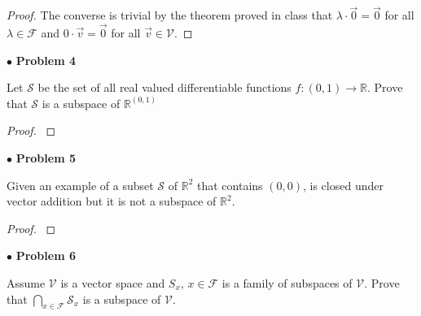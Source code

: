 \documentclass{article}
\begin{document}
\begin{proof}
The converse is trivial by the theorem proved in class that $\lambda \cdot \vec{0} = \vec{0}$ for all $\lambda \in \mathcal{F}$ and $0 \cdot \vec{v} = \vec{0}$ for all $\vec{v} \in \mathcal{V}$. 

\end{proof}


\newpage
$\bullet$ \textbf{Problem 4}
\medskip

\begin{itshape}
Let $\mathcal{S}$ be the set of all real valued differentiable functions $f:(0,1) \to \mathbb{R}$. Prove that $\mathcal{S}$ is a subspace of $\mathbb{R}^{(0,1)}$
\end{itshape}
\medskip

\begin{proof}
$ $ \newline
\end{proof}


\newpage
$\bullet$ \textbf{Problem 5}
\medskip

\begin{itshape}
Given an example of a subset $\mathcal{S}$ of $\mathbb{R}^2$ that contains $(0,0)$, is closed under vector addition but it is not a subspace of $\mathbb{R}^2$.
\end{itshape}
\medskip

\begin{proof}
$ $ \newline
\end{proof}


\newpage
$\bullet$ \textbf{Problem 6}
\medskip

\begin{itshape}
Assume $\mathcal{V}$ is a vector space and $S_{x}$, $x \in \mathcal{F}$ is a family of subspaces of $\mathcal{V}$. Prove that $\bigcap \limits_{x \in \mathcal{F}} \mathcal{S}_{x}$ is a subspace of $\mathcal{V}$.
\end{itshape}
\medskip
\end{document}

